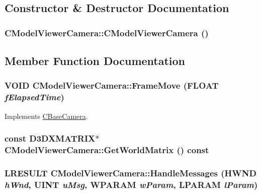 \subsection{Constructor \& Destructor Documentation}
\hypertarget{class_c_model_viewer_camera_a6e6f27ab21440758f97e0069a14a41a1}{
\subsubsection[{CModelViewerCamera}]{\setlength{\rightskip}{0pt plus 5cm}CModelViewerCamera::CModelViewerCamera ()}}
\label{class_c_model_viewer_camera_a6e6f27ab21440758f97e0069a14a41a1}


\subsection{Member Function Documentation}
\hypertarget{class_c_model_viewer_camera_a5309ad1ff0044124c05737da466b7315}{
\subsubsection[{FrameMove}]{\setlength{\rightskip}{0pt plus 5cm}VOID CModelViewerCamera::FrameMove (FLOAT {\em fElapsedTime})}}
\label{class_c_model_viewer_camera_a5309ad1ff0044124c05737da466b7315}


Implements \hyperlink{class_c_base_camera_a21db15a8cdca60d1540d958a32708703}{CBaseCamera}.\hypertarget{class_c_model_viewer_camera_adf18f000e0d304a5172424ad4151ddb6}{
\subsubsection[{GetWorldMatrix}]{\setlength{\rightskip}{0pt plus 5cm}const D3DXMATRIX$\ast$ CModelViewerCamera::GetWorldMatrix () const}}
\label{class_c_model_viewer_camera_adf18f000e0d304a5172424ad4151ddb6}
\hypertarget{class_c_model_viewer_camera_ad50f3bd74420f1ee3c0b6ca9ac3ec348}{
\subsubsection[{HandleMessages}]{\setlength{\rightskip}{0pt plus 5cm}LRESULT CModelViewerCamera::HandleMessages (HWND {\em hWnd}, \/  UINT {\em uMsg}, \/  WPARAM {\em wParam}, \/  LPARAM {\em lParam})}}
\label{class_c_model_viewer_camera_ad50f3bd74420f1ee3c0b6ca9ac3ec348}


